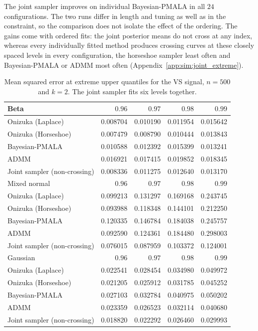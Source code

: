 The joint sampler improves on individual Bayesian-PMALA in all $24$ configurations. The two runs differ in length and tuning as well as in the constraint, so the comparison does not isolate the effect of the ordering. The gains come with ordered fits: the joint posterior means do not cross at any index, whereas every individually fitted method produces crossing curves at these closely spaced levels in every configuration, the horseshoe sampler least often and Bayesian-PMALA or ADMM most often (Appendix~\ref{app:sim:joint_extreme}).

\begin{table}[!htbp]
\centering
\small
\caption{Mean squared error at extreme upper quantiles for the VS signal, $n=500$ and $k=2$. The joint sampler fits six levels together.}
\label{tab:vs_ext_upper_mse}
\begin{tabular}{lrrrr}
\toprule
Beta & $0.96$ & $0.97$ & $0.98$ & $0.99$ \\
\midrule
Onizuka (Laplace) & 0.008704 & 0.010190 & 0.011954 & 0.015642 \\
Onizuka (Horseshoe) & 0.007479 & 0.008790 & 0.010444 & 0.013843 \\
Bayesian-PMALA & 0.010588 & 0.012392 & 0.015399 & 0.013241 \\
ADMM & 0.016921 & 0.017415 & 0.019852 & 0.018345 \\
Joint sampler (non-crossing) & 0.008336 & 0.011275 & 0.012640 & 0.013170 \\
\midrule
Mixed normal & $0.96$ & $0.97$ & $0.98$ & $0.99$ \\
\midrule
Onizuka (Laplace) & 0.099213 & 0.131297 & 0.169168 & 0.243745 \\
Onizuka (Horseshoe) & 0.093988 & 0.118348 & 0.144101 & 0.212250 \\
Bayesian-PMALA & 0.120335 & 0.146784 & 0.184038 & 0.245757 \\
ADMM & 0.092590 & 0.124361 & 0.184480 & 0.298003 \\
Joint sampler (non-crossing) & 0.076015 & 0.087959 & 0.103372 & 0.124001 \\
\midrule
Gaussian & $0.96$ & $0.97$ & $0.98$ & $0.99$ \\
\midrule
Onizuka (Laplace) & 0.022541 & 0.028454 & 0.034980 & 0.049972 \\
Onizuka (Horseshoe) & 0.021205 & 0.025912 & 0.031785 & 0.045252 \\
Bayesian-PMALA & 0.027103 & 0.032784 & 0.040975 & 0.050202 \\
ADMM & 0.023359 & 0.026523 & 0.032114 & 0.040680 \\
Joint sampler (non-crossing) & 0.018820 & 0.022292 & 0.026460 & 0.029993 \\
\bottomrule
\end{tabular}
\end{table}

